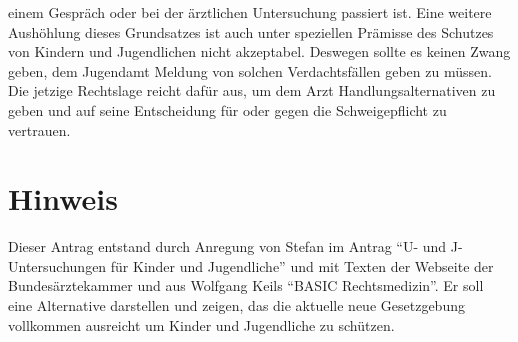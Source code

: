 einem Gespräch oder bei der ärztlichen Untersuchung passiert ist. Eine weitere Aushöhlung dieses Grundsatzes ist auch unter speziellen Prämisse des Schutzes von Kindern und Jugendlichen nicht akzeptabel. Deswegen sollte es keinen Zwang geben, dem Jugendamt Meldung von solchen Verdachtsfällen geben zu müssen. Die jetzige Rechtslage reicht dafür aus, um dem Arzt Handlungsalternativen zu geben und auf seine Entscheidung für oder gegen die Schweigepflicht zu vertrauen.

\section{Hinweis}

Dieser Antrag entstand durch Anregung von Stefan im Antrag ``U- und J-Untersuchungen für Kinder und Jugendliche'' und mit Texten der Webseite der Bundesärztekammer und aus Wolfgang Keils ``BASIC Rechtsmedizin''. Er soll eine Alternative darstellen und zeigen, das die aktuelle neue Gesetzgebung vollkommen ausreicht um Kinder und Jugendliche zu schützen.
